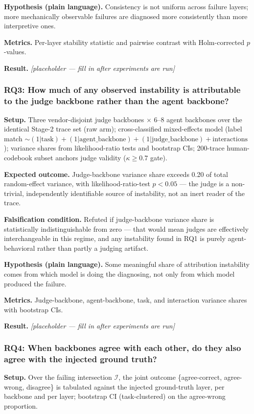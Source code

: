 \documentclass[11pt]{article}
\newcommand{\ph}{\textit{[placeholder --- fill in after experiments are run]}}
\begin{document}
\textbf{Hypothesis (plain language).} Consistency is not uniform across failure layers; more mechanically observable failures are diagnosed more consistently than more interpretive ones.

\textbf{Metrics.} Per-layer stability statistic and pairwise contrast with Holm-corrected $p$-values.

\textbf{Result.} \ph

\subsubsection{RQ3: How much of any observed instability is attributable to the judge backbone rather than the agent backbone?}
\textbf{Setup.} Three vendor-disjoint judge backbones $\times$ 6--8 agent backbones over the identical Stage-2 trace set (raw arm); cross-classified mixed-effects model (label match $\sim (1|\text{task}) + (1|\text{agent\_backbone}) + (1|\text{judge\_backbone}) + \text{interactions}$); variance shares from likelihood-ratio tests and bootstrap CIs; 200-trace human-codebook subset anchors judge validity ($\kappa \geq 0.7$ gate).

\textbf{Expected outcome.} Judge-backbone variance share exceeds 0.20 of total random-effect variance, with likelihood-ratio-test $p < 0.05$ --- the judge is a non-trivial, independently identifiable source of instability, not an inert reader of the trace.

\textbf{Falsification condition.} Refuted if judge-backbone variance share is statistically indistinguishable from zero --- that would mean judges are effectively interchangeable in this regime, and any instability found in RQ1 is purely agent-behavioral rather than partly a judging artifact.

\textbf{Hypothesis (plain language).} Some meaningful share of attribution instability comes from which model is doing the diagnosing, not only from which model produced the failure.

\textbf{Metrics.} Judge-backbone, agent-backbone, task, and interaction variance shares with bootstrap CIs.

\textbf{Result.} \ph

\subsubsection{RQ4: When backbones agree with each other, do they also agree with the injected ground truth?}
\textbf{Setup.} Over the failing intersection $\mathcal{I}$, the joint outcome \{agree-correct, agree-wrong, disagree\} is tabulated against the injected ground-truth layer, per backbone and per layer; bootstrap CI (task-clustered) on the agree-wrong proportion.
\end{document}
